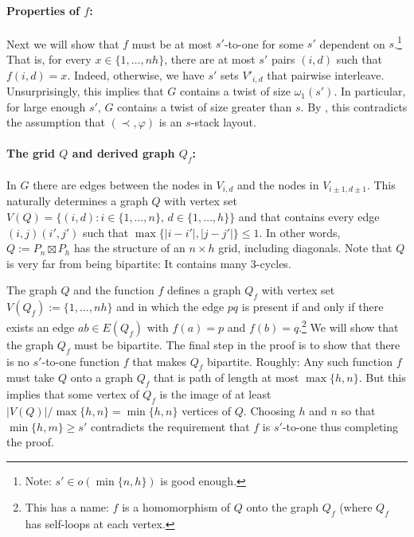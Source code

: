 \documentclass[kpfonts]{patmorin}
\begin{document}
\paragraph{Properties of $f$:}

Next we will show that $f$ must be at most $s'$-to-one for some $s'$ dependent on $s$.\footnote{Note: $s'\in o(\min\{n,h\})$ is good enough.}  That is, for every $x\in\{1,\ldots,nh\}$, there are at most $s'$ pairs $(i,d)$ such that $f(i,d)=x$.  Indeed, otherwise, we have $s'$ sets $V'_{i,d}$ that pairwise interleave.  Unsurprisingly, this implies that $G$ contains a twist of size $\omega_1(s')$.  In particular, for large enough $s'$, $G$ contains a twist of size greater than $s$. By , this contradicts the assumption that $(\prec,\varphi)$ is an $s$-stack layout.

\paragraph{The grid $Q$ and derived graph $Q_f$:}
In $G$ there are edges between the nodes in $V_{i,d}$ and the nodes in $V_{i\pm 1,d\pm 1}$.  This naturally determines a graph $Q$ with vertex set $V(Q)=\{(i,d):i\in\{1,\ldots,n\},\, d\in\{1,\ldots,h\}\}$ and that contains every edge $(i,j)(i',j')$ such that $\max\{|i-i'|,|j-j'|\}\le 1$. In other words, $Q:=P_n\boxtimes P_h$ has the structure of an $n\times h$ grid, including diagonals. Note that $Q$ is very far from being bipartite: It contains many 3-cycles.

The graph $Q$ and the function $f$ defines a graph $Q_f$ with vertex set $V(Q_f):=\{1,\ldots,nh\}$ and in which the edge $pq$ is present if and only if there exists an edge $ab\in E(Q_f)$ with $f(a)=p$ and $f(b)=q$.\footnote{This has a name: $f$ is a homomorphism of $Q$ onto the graph $Q_f$ (where $Q_f$ has self-loops at each vertex.}  We will show that the graph $Q_f$ must be bipartite.  The final step in the proof is to show that there is no $s'$-to-one function $f$ that makes $Q_f$ bipartite.  Roughly:  Any such function $f$ must take $Q$ onto a graph $Q_f$ that is path of length at most $\max\{h,n\}$.  But this implies that some vertex of $Q_f$ is the image of at least $|V(Q)|/\max\{h,n\}=\min\{h,n\}$ vertices of $Q$. Choosing $h$ and $n$ so that $\min\{h,m\}\ge s'$ contradicts the requirement that $f$ is $s'$-to-one thus completing the proof.
% 
% 
\end{document}

